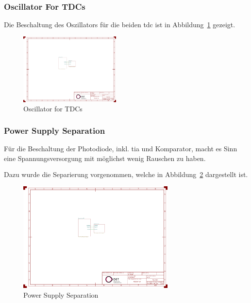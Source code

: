 \documentclass[11pt,a4paper,hidelinks]{article}
\begin{document}
\subsubsection{Oscillator For TDCs}

Die Beschaltung des Oszillators für die beiden \acrshort{tdc} ist in Abbildung~\ref{fig:oscillator_tdc} gezeigt.

\begin{figure}[H]
    \centering
    \includegraphics[page=2, trim=80 90 930 550, clip, width=0.45\textwidth]{attachments/schematic.pdf}
    \caption{Oscillator for TDCs}\label{fig:oscillator_tdc}
\end{figure}

\subsubsection{Power Supply Separation}

Für die Beschaltung der Photodiode, inkl. \acrshort{tia} und Komparator, macht es Sinn eine Spannungsversorgung mit
möglichst wenig Rauschen zu haben.

Dazu wurde die Separierung vorgenommen, welche in Abbildung~\ref{fig:power_supply_separation} dargestellt ist.

\begin{figure}[H]
    \centering
    \includegraphics[page=2, trim=260 90 640 550, clip, width=0.7\textwidth]{attachments/schematic.pdf}
    \caption{Power Supply Separation}\label{fig:power_supply_separation}
\end{figure}
\end{document}

